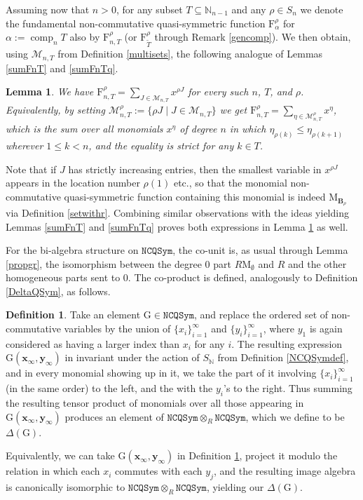 \documentclass{article}
\newtheorem{lem}[thm]{Lemma}
\theoremstyle{definition}
\newtheorem{defn}[thm]{Definition}
\begin{document}
Assuming now that $n>0$, for any subset $T\subseteq\mathbb{N}_{n-1}$ and any $\rho \in S_{n}$ we denote the fundamental non-commutative quasi-symmetric function $\mathrm{F}_{\alpha}^{\rho}$ for $\alpha:=\operatorname{comp}_{n}T$ also by $\mathrm{F}_{n,T}^{\rho}$ (or $\mathrm{F}_{\tilde{T}}^{\rho}$ through Remark \ref{gencomp}). We then obtain, using $\mathcal{M}_{n,T}$ from Definition \ref{multisets}, the following analogue of Lemmas \ref{sumFnT} and \ref{sumFnTq}.
\begin{lem}
We have $\mathrm{F}_{n,T}^{\rho}=\sum_{J\in\mathcal{M}_{n,T}}x^{\rho J}$ for every such $n$, $T$, and $\rho$. Equivalently, by setting $\mathcal{M}_{n,T}^{\rho}:=\{\rho J\;|\;J\in\mathcal{M}_{n,T}\}$ we get $\mathrm{F}_{n,T}^{\rho}=\sum_{\eta\in\mathcal{M}_{n,T}^{\rho}}x^{\eta}$, which is the sum over all monomials $x^{\eta}$ of degree $n$ in which $\eta_{\rho(k)}\leq\eta_{\rho(k+1)}$ wherever $1 \leq k<n$, and the equality is strict for any $k \in T$. \label{sumFnTNC}
\end{lem}
Note that if $J$ has strictly increasing entries, then the smallest variable in $x^{\rho J}$ appears in the location number $\rho(1)$ etc., so that the monomial non-commutative quasi-symmetric function containing this monomial is indeed $\mathrm{M}_{\mathbf{B}_{\rho}}$ via Definition \ref{setwithr}. Combining similar observations with the ideas yielding Lemmas \ref{sumFnT} and \ref{sumFnTq} proves both expressions in Lemma \ref{sumFnTNC} as well.

\medskip

For the bi-algebra structure on $\mathtt{NCQSym}$, the co-unit is, as usual through Lemma \ref{propgr}, the isomorphism between the degree 0 part $R\mathrm{M}_{\emptyset}$ and $R$ and the other homogeneous parts sent to 0. The co-product is defined, analogously to Definition \ref{DeltaQSym}, as follows.
\begin{defn}
Take an element $\mathrm{G}\in\mathtt{NCQSym}$, and replace the ordered set of non-commutative variables by the union of $\{x_{i}\}_{i=1}^{\infty}$ and $\{y_{i}\}_{i=1}^{\infty}$, where $y_{1}$ is again considered as having a larger index than $x_{i}$ for any $i$. The resulting expression $\mathrm{G}(\mathbf{x}_{\infty},\mathbf{y}_{\infty})$ in invariant under the action of $S_{\mathbb{N}}$ from Definition \ref{NCQSymdef}, and in every monomial showing up in it, we take the part of it involving $\{x_{i}\}_{i=1}^{\infty}$ (in the same order) to the left, and the with the $y_{i}$'s to the right. Thus summing the resulting tensor product of monomials over all those appearing in $\mathrm{G}(\mathbf{x}_{\infty},\mathbf{y}_{\infty})$ produces an element of $\mathtt{NCQSym}\otimes_{R}\mathtt{NCQSym}$, which we define to be $\Delta(\mathrm{G})$. \label{DeltaNCQSym}
\end{defn}
Equivalently, we can take $\mathrm{G}(\mathbf{x}_{\infty},\mathbf{y}_{\infty})$ in Definition \ref{DeltaNCQSym}, project it modulo the relation in which each $x_{i}$ commutes with each $y_{j}$, and the resulting image algebra is canonically isomorphic to $\mathtt{NCQSym}\otimes_{R}\mathtt{NCQSym}$, yielding our $\Delta(\mathrm{G})$.
\end{document}
